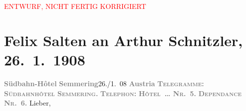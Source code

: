 
\begin{center}
            \textcolor{red}{ENTWURF, NICHT FERTIG KORRIGIERT}
                      \end{center}
            
         
         \renewcommand{\erwaehntePersonen}{Personen: Samuel Fischer, Hedwig Fischer, Margarethe Kainz, Josef Kainz, Anna Katharina Rehmann, Ottilie Salten, Paul Salten, Paula Schlenther, Paul Schlenther, Olga Schnitzler, Heinrich Schnitzler,  W. Fred}
         \renewcommand{\erwaehnteInstitutionen}{Institutionen: Franz-Grillparzer-Preis}
         \renewcommand{\erwaehnteOrte}{Orte: Semmering, Südbahnhotel, Wien, Österreich}
         \renewcommand{\erwaehnteWerke}{Werke: Der Weg ins Freie. Roman}
               \section[Felix Salten an Arthur Schnitzler, 26. 1. 1908]{ Felix Salten an Arthur Schnitzler, 26. 1. 1908}\nopagebreak{}\rehead{ }\begin{ledgroupsized}[t]{13cm}\normalsize\beginnumbering \toendnotes[C]{\smallbreak\pagebreak[2]} 
\toendnotes[C]{\smallbreak}\pstart
           \noindent{}{\pb}\textcolor{gray}{\textbf{Südbahn-Hôtel}}\pend
           \pstart
           \textcolor{gray}{\textbf{Semmering}}\hfill 26./1. 08\pend
           \pstart
           \textcolor{gray}{\textbf{Austria}}\pend
           \pstart
           \textcolor{gray}{\textbf{\textsc{Telegramme:}}}\pend
           \pstart
           \textcolor{gray}{\textbf{\textsc{Südbahnhôtel Semmering.}}}\pend
           \pstart
           \textcolor{gray}{\textbf{\textsc{Telephon:}}}\pend
           \pstart
           \textcolor{gray}{\textbf{\textsc{Hôtel {\dots} Nr. 5.}}}\pend
           \pstart
           \textcolor{gray}{\textbf{\textsc{Dependance Nr. 6.}}}\pend
           \pstart{}Lieber,\pend\pstart

\end{ledgroupsized}
